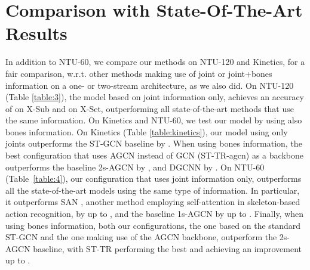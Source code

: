 \documentclass[review]{cvpr}
\begin{document}
\section{Comparison with State-Of-The-Art Results}\label{comparison}
In addition to NTU-60, we compare our methods on NTU-120 and Kinetics, for a fair comparison, w.r.t. other methods making use of joint or joint+bones information on a one- or two-stream architecture, as we also did.
On NTU-120 (Table \ref{table:3}), the model based on joint information only, achieves an accuracy of  on X-Sub and  on X-Set, outperforming all state-of-the-art methods that use the same information. On Kinetics and NTU-60, we test our model by using also bones information. On Kinetics (Table \ref{table:kinetics}), our model using only joints outperforms the ST-GCN baseline by . When using bones information, the best configuration that uses AGCN instead of GCN (ST-TR-agcn) as a backbone outperforms the baseline 2s-AGCN by , and DGCNN \cite{dirgraph} by . On NTU-60 (Table~\ref{table:4}), our configuration that uses joint information only, outperforms all the state-of-the-art models using the same type of information. In particular, it outperforms SAN \cite{san}, another method employing self-attention in skeleton-based action recognition, by up to , and the baseline 1s-AGCN by up to . Finally, when using bones information, both our configurations, the one based on the standard ST-GCN and the one making use of the AGCN backbone, outperform the 2s-AGCN baseline, with ST-TR performing the best and achieving an improvement up to .
\end{document}
